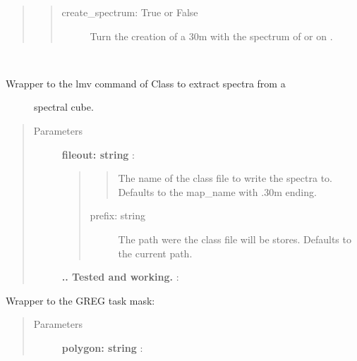 \documentclass[a4paper,10pt,english]{sphinxmanual}
\begin{document}
\begin{fulllineitems}
\begin{fulllineitems}
\begin{quote}
\begin{description}
\begin{quote}
\begin{description}
\item[{create\_spectrum: True or False}] \leavevmode
Turn the creation of a 30m with the spectrum of  or on
.

\end{description}
\end{quote}

\end{description}\end{quote}

\end{fulllineitems}


\begin{fulllineitems}
\label{maps:astrolyze.maps.gildas.GildasMap.lmv}~\begin{description}
\item[{Wrapper to the lmv command of Class to extract spectra from a}] \leavevmode
spectral cube.

\end{description}
\begin{quote}\begin{description}
\item[{Parameters }] \leavevmode
\textbf{fileout: string} :
\begin{quote}
\begin{quote}

The name of the class file to write the spectra to. Defaults to
the map\_name with .30m ending.
\end{quote}
\begin{description}
\item[{prefix: string}] \leavevmode
The path were the class file will be stores. Defaults to
the current path.

\end{description}
\end{quote}

\textbf{..        Tested and working.} :

\end{description}\end{quote}

\end{fulllineitems}


\begin{fulllineitems}
\label{maps:astrolyze.maps.gildas.GildasMap.mask}
Wrapper to the GREG task mask:
\begin{quote}\begin{description}
\item[{Parameters }] \leavevmode
\textbf{polygon: string} :
\begin{quote}


\end{quote}
\end{description}
\end{quote}
\end{fulllineitems}
\end{fulllineitems}
\end{document}

